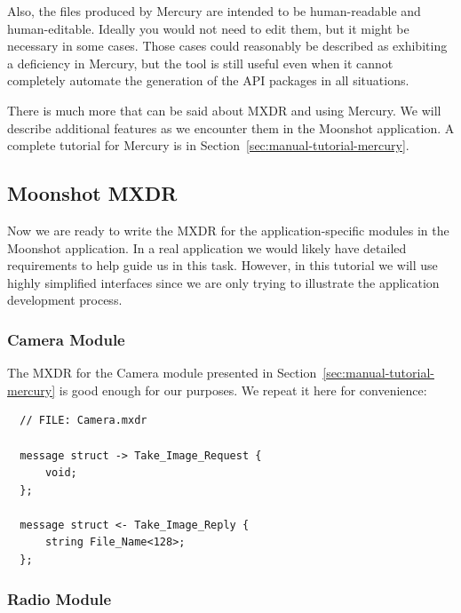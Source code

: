 Also, the files produced by Mercury are intended to be human-readable and human-editable.
Ideally you would not need to edit them, but it might be necessary in some cases. Those cases
could reasonably be described as exhibiting a deficiency in Mercury, but the tool is still
useful even when it cannot completely automate the generation of the API packages in all
situations.

There is much more that can be said about MXDR and using Mercury. We will describe additional
features as we encounter them in the Moonshot application. A complete tutorial for Mercury is in
Section~\ref{sec:manual-tutorial-mercury}.

\subsection{Moonshot MXDR}
\label{sec:manual-tutorial-moonshot-mxdr}

Now we are ready to write the MXDR for the application-specific modules in the Moonshot application.
In a real application we would likely have detailed requirements to help guide us in this task.
However, in this tutorial we will use highly simplified interfaces since we are only trying to
illustrate the application development process.

\subsubsection{Camera Module}

The MXDR for the Camera module presented in Section~\ref{sec:manual-tutorial-mercury} is good
enough for our purposes. We repeat it here for convenience:

\begin{verbatim}
  // FILE: Camera.mxdr

  message struct -> Take_Image_Request {
      void;
  };

  message struct <- Take_Image_Reply {
      string File_Name<128>;
  };
\end{verbatim}

\subsubsection{Radio Module}



